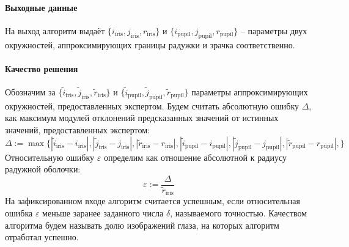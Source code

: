 \documentclass[12pt,twoside]{article}
\newcommand{\IrisRadius}{r_{\text{iris}}}
\newcommand{\IrisRadiusTrue}{\widetilde{r}_{\text{iris}}}
\newcommand{\IrisCoordI}{i_{\text{iris}}}
\newcommand{\IrisCoordITrue}{\widetilde{i}_{\text{iris}}}
\newcommand{\IrisCoordJ}{j_{\text{iris}}}
\newcommand{\IrisCoordJTrue}{\widetilde{j}_{\text{iris}}}
\newcommand{\PupilRadius}{r_{\text{pupil}}}
\newcommand{\PupilRadiusTrue}{\widetilde{r}_{\text{pupil}}}
\newcommand{\PupilCoordI}{i_{\text{pupil}}}
\newcommand{\PupilCoordITrue}{\widetilde{i}_{\text{pupil}}}
\newcommand{\PupilCoordJ}{j_{\text{pupil}}}
\newcommand{\PupilCoordJTrue}{\widetilde{j}_{\text{pupil}}}
\begin{document}
\paragraph{Выходные данные}
На выход алгоритм выдаёт $\{\IrisCoordI, \IrisCoordJ, \IrisRadius \}$ и $\{\PupilCoordI, \PupilCoordJ, \PupilRadius \}$ -- параметры двух окружностей, аппроксимирующих границы радужки и зрачка соответственно.
\paragraph{Качество решения}
Обозначим за $\{\IrisCoordITrue, \IrisCoordJTrue, \IrisRadiusTrue \}$ и $\{\PupilCoordITrue, \PupilCoordJTrue, \PupilRadiusTrue \}$ параметры аппроксимирующих окружностей, предоставленных экспертом. Будем считать абсолютную ошибку $\Delta$, как максимум модулей отклонений предсказанных значений от истинных значений, предоставленных экспертом:
$$
\Delta := \max\{
|\IrisCoordITrue - \IrisCoordI|,
|\IrisCoordJTrue - \IrisCoordJ|,
|\IrisRadiusTrue - \IrisRadius|,
|\PupilCoordITrue - \PupilCoordI|,
|\PupilCoordJTrue - \PupilCoordJ|,
|\PupilRadiusTrue - \PupilRadius|,
\}$$
Относительную ошибку $\varepsilon$ определим как отношение абсолютной к радиусу радужной оболочки:
$$
\varepsilon := \frac{\Delta}{\IrisRadiusTrue}
$$
На зафиксированном входе алгоритм считается успешным, если относительная ошибка $\varepsilon$ меньше заранее заданного числа $\delta$, называемого точностью.
Качеством алгоритма будем называть долю изображений глаза, на которых алгоритм отработал успешно.






\end{document}
